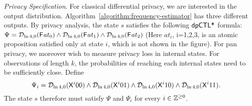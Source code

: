 \noindent
\emph{Privacy Specification}.
For classical differential privacy, we are interested in the output
distribution. Algorithm~\ref{algorithm:frequency-estimator} has three
different outputs. By privacy analysis, the state $s$ satisfies the
following $\textsf{dpCTL*}$ formula:
$
\Psi = \mathcal{D}_{{\ln 4}, {0}} (\mathsf{F} \mathit{at}_0) \wedge \mathcal{D}_{{\ln 4}, {0}} (\mathsf{F}
\mathit{at}_1) \wedge \mathcal{D}_{{\ln 4}, {0}} (\mathsf{F} \mathit{at}_2)
$
(Here
$\mathit{at}_i$, i=1,2,3, is an atomic proposition satisfied only at state $i$, which is not shown in the figure).
For pan privacy, we moreover wish to measure privacy loss in internal
states. For observations of length $k$, the probabilities of reaching
each internal states need to be sufficiently close. Define
\[
\Psi_i =
\mathcal{D}_{{\ln 4}, {0}} (\mathsf{X}^i {00}) \wedge
\mathcal{D}_{{\ln 4}, {0}} (\mathsf{X}^i {01}) \wedge
\mathcal{D}_{{\ln 4}, {0}} (\mathsf{X}^i {10}) \wedge
\mathcal{D}_{{\ln 4}, {0}} (\mathsf{X}^i {11}).
\]
The state $s$ therefore must satisfy $\Psi$ and $\Psi_i$ for every $i
\in \mathbb{Z}^{\geq 0}$.  
